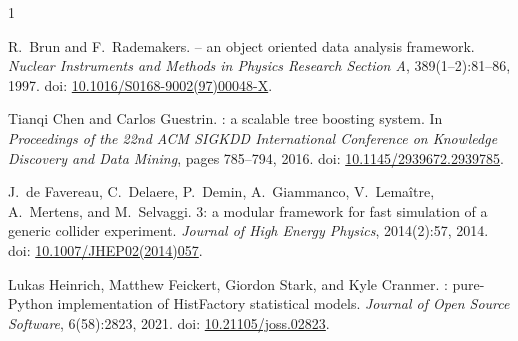\documentclass[11pt,a4paper]{article}
\begin{document}
%
%     
%     
\begin{thebibliography}{1}

R.~Brun and F.~Rademakers.
 -- an object oriented data analysis framework.
\newblock \emph{Nuclear Instruments and Methods in Physics Research Section A},
  389(1--2):81--86, 1997.
\newblock doi: \href{https://doi.org/10.1016/S0168-9002(97)00048-X}{10.1016/S0168-9002(97)00048-X}.

Tianqi Chen and Carlos Guestrin.
: a scalable tree boosting system.
\newblock In \emph{Proceedings of the 22nd ACM SIGKDD International Conference
  on Knowledge Discovery and Data Mining}, pages 785--794, 2016.
\newblock doi: \href{https://doi.org/10.1145/2939672.2939785}{10.1145/2939672.2939785}.

J.~de Favereau, C.~Delaere, P.~Demin, A.~Giammanco, V.~Lema\^itre, A.~Mertens,
  and M.~Selvaggi.
 3: a modular framework for fast simulation of a generic
  collider experiment.
\newblock \emph{Journal of High Energy Physics}, 2014(2):57, 2014.
\newblock doi: \href{https://doi.org/10.1007/JHEP02(2014)057}{10.1007/JHEP02(2014)057}.

Lukas Heinrich, Matthew Feickert, Giordon Stark, and Kyle Cranmer.
: pure-{Python} implementation of {HistFactory} statistical
  models.
\newblock \emph{Journal of Open Source Software}, 6(58):2823, 2021.
\newblock doi: \href{https://doi.org/10.21105/joss.02823}{10.21105/joss.02823}.

\end{thebibliography}
\end{document}
